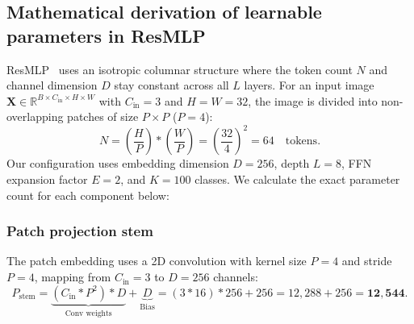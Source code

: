 \subsection{Mathematical derivation of learnable parameters in ResMLP}
\label{subsec:resmlp_param_derivation}
ResMLP~\cite{touvron2021resmlp} uses an isotropic columnar structure where the token count $N$ and channel dimension $D$ stay constant across all $L$ layers. For an input image $\mathbf{X} \in \mathbb{R}^{B \times C_{\text{in}} \times H \times W}$ with $C_{\text{in}}=3$ and $H=W=32$, the image is divided into non-overlapping patches of size $P \times P$ ($P=4$):
\begin{equation}
    N = \left(\frac{H}{P}\right) * \left(\frac{W}{P}\right) = \left(\frac{32}{4}\right)^2 = 64 \quad \text{tokens.}
\end{equation}
Our configuration uses embedding dimension $D=256$, depth $L=8$, FFN expansion factor $E=2$, and $K=100$ classes. We calculate the exact parameter count for each component below:

\subsubsection{Patch projection stem}
The patch embedding uses a 2D convolution with kernel size $P=4$ and stride $P=4$, mapping from $C_{\text{in}}=3$ to $D=256$ channels:
\begin{equation}
    P_{\text{stem}} = \underbrace{(C_{\text{in}} * P^2) * D}_{\text{Conv weights}} + \underbrace{D}_{\text{Bias}} = (3 * 16) * 256 + 256 = 12,288 + 256 = \mathbf{12,544}.
\end{equation}

